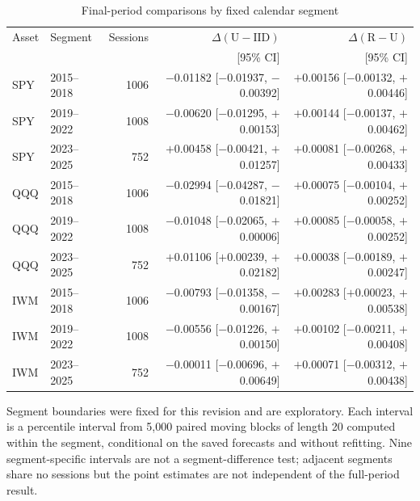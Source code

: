 \begin{table}[!htbp]\centering\small\setlength{\tabcolsep}{6pt}
\caption{Final-period comparisons by fixed calendar segment}\label{tab:segments}
\begin{tabular}{llrrr}\toprule
Asset & Segment & Sessions & $\Delta(\mathrm U-\mathrm{IID})$ & $\Delta(\mathrm R-\mathrm U)$\\
 & & & [95\% CI] & [95\% CI]\\\midrule
SPY & 2015--2018 & 1006 & $-$0.01182 [$-$0.01937, $-$0.00392] & $+$0.00156 [$-$0.00132, $+$0.00446]\\
SPY & 2019--2022 & 1008 & $-$0.00620 [$-$0.01295, $+$0.00153] & $+$0.00144 [$-$0.00137, $+$0.00462]\\
SPY & 2023--2025 & 752 & $+$0.00458 [$-$0.00421, $+$0.01257] & $+$0.00081 [$-$0.00268, $+$0.00433]\\
\midrule
QQQ & 2015--2018 & 1006 & $-$0.02994 [$-$0.04287, $-$0.01821] & $+$0.00075 [$-$0.00104, $+$0.00252]\\
QQQ & 2019--2022 & 1008 & $-$0.01048 [$-$0.02065, $+$0.00006] & $+$0.00085 [$-$0.00058, $+$0.00252]\\
QQQ & 2023--2025 & 752 & $+$0.01106 [$+$0.00239, $+$0.02182] & $+$0.00038 [$-$0.00189, $+$0.00247]\\
\midrule
IWM & 2015--2018 & 1006 & $-$0.00793 [$-$0.01358, $-$0.00167] & $+$0.00283 [$+$0.00023, $+$0.00538]\\
IWM & 2019--2022 & 1008 & $-$0.00556 [$-$0.01226, $+$0.00150] & $+$0.00102 [$-$0.00211, $+$0.00408]\\
IWM & 2023--2025 & 752 & $-$0.00011 [$-$0.00696, $+$0.00649] & $+$0.00071 [$-$0.00312, $+$0.00438]\\
\bottomrule\end{tabular}
\par\smallskip\parbox{0.98\linewidth}{\footnotesize Segment boundaries were fixed for this revision and are exploratory. Each interval is a percentile interval from 5,000 paired moving blocks of length 20 computed within the segment, conditional on the saved forecasts and without refitting. Nine segment-specific intervals are not a segment-difference test; adjacent segments share no sessions but the point estimates are not independent of the full-period result.}
\end{table}
